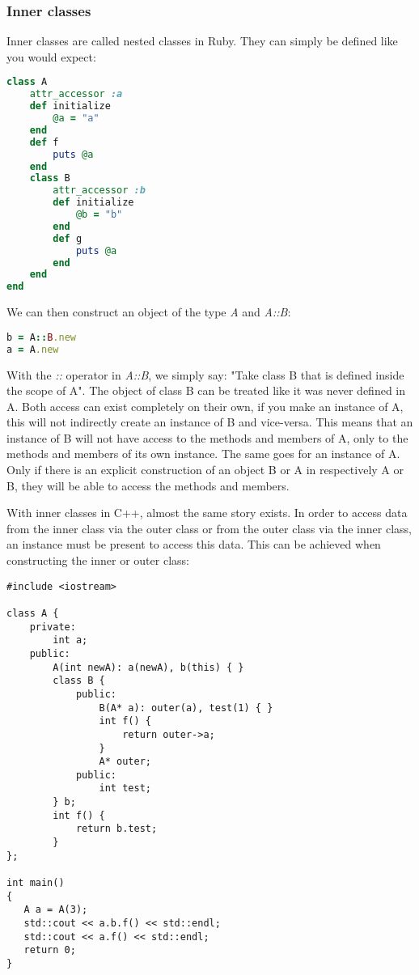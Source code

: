 \documentclass[10pt,a4paper,twocolumn]{article}
\begin{document}
\subsubsection{Inner classes}
Inner classes are called nested classes in Ruby. They can simply be defined like you would expect:

\begin{lstlisting}[language=Ruby]
class A
	attr_accessor :a
	def initialize
		@a = "a"
	end
	def f
		puts @a
	end
	class B
		attr_accessor :b
		def initialize 
			@b = "b"
		end
		def g
			puts @a
		end
	end
end
\end{lstlisting}

We can then construct an object of the type \textit{A} and \textit{A::B}:

\begin{lstlisting}[language=Ruby]
b = A::B.new
a = A.new
\end{lstlisting}

With the \textit{::} operator in \textit{A::B}, we simply say: "Take class B that is defined inside the scope of A". The object of class B can be treated like it was never defined in A. Both access can exist completely on their own, if you make an instance of A, this will not indirectly create an instance of B and vice-versa. This means that an instance of B will not have access to the methods and members of A, only to the methods and members of its own instance. The same goes for an instance of A. Only if there is an explicit construction of an object B or A in respectively A or B, they will be able to access the methods and members.

With inner classes in C++, almost the same story exists. In order to access data from the inner class via the outer class or from the outer class via the inner class, an instance must be present to access this data. This can be achieved when constructing the inner or outer class:

\begin{lstlisting}
#include <iostream>

class A {
	private:
		int a;
	public:
		A(int newA): a(newA), b(this) { }
		class B {
			public:
				B(A* a): outer(a), test(1) { }
				int f() {
					return outer->a;
				}
				A* outer;
			public:
				int test;
		} b;
		int f() {
			return b.test;
		}
};
 
int main()
{
   A a = A(3);
   std::cout << a.b.f() << std::endl;
   std::cout << a.f() << std::endl;
   return 0;
}
\end{lstlisting}
\end{document}
